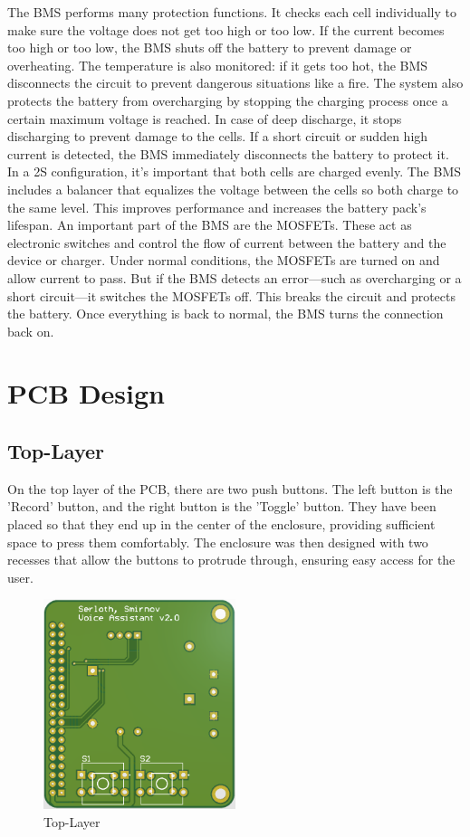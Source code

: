 The BMS performs many protection functions. It checks each cell individually to make sure the voltage does not get too high or too low. If the current becomes too high or too low, the BMS shuts off the battery to prevent damage or overheating. The temperature is also monitored: if it gets too hot, the BMS disconnects the circuit to prevent dangerous situations like a fire.
The system also protects the battery from overcharging by stopping the charging process once a certain maximum voltage is reached. In case of deep discharge, it stops discharging to prevent damage to the cells. If a short circuit or sudden high current is detected, the BMS immediately disconnects the battery to protect it.
In a 2S configuration, it's important that both cells are charged evenly. The BMS includes a balancer that equalizes the voltage between the cells so both charge to the same level. This improves performance and increases the battery pack's lifespan.
An important part of the BMS are the MOSFETs. These act as electronic switches and control the flow of current between the battery and the device or charger.
Under normal conditions, the MOSFETs are turned on and allow current to pass. But if the BMS detects an error—such as overcharging or a short circuit—it switches the MOSFETs off. This breaks the circuit and protects the battery. Once everything is back to normal, the BMS turns the connection back on.

\section{PCB Design}

\subsection{Top-Layer}
On the top layer of the PCB, there are two push buttons. The left button is the 'Record' button, and the right button is the 'Toggle' button. They have been placed so that they end up in the center of the enclosure, providing sufficient space to press them comfortably. The enclosure was then designed with two recesses that allow the buttons to protrude through, ensuring easy access for the user.

\begin{figure}[H]
  \centering
  \includegraphics[width=0.5\textwidth]{assets/TopLayer}
  \caption{Top-Layer}
\end{figure}

